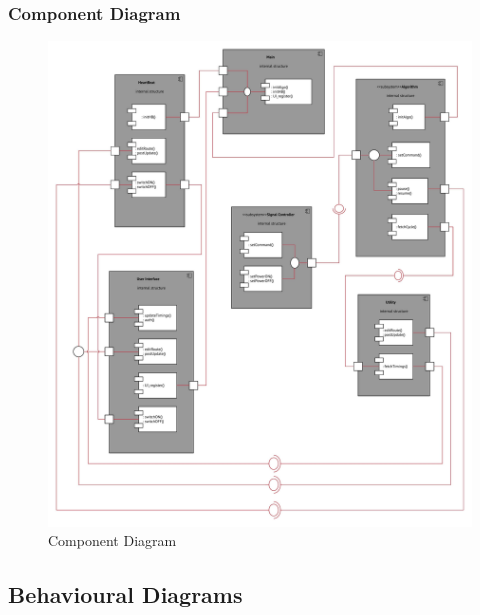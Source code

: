 \documentclass[12pt,a4paper,final]{report}
\begin{document}
\subsubsection{Component Diagram}
	\begin{figure}[!h]
		\begin{center}
			\includegraphics[scale=0.5]{Diagrams/Old Diagrams/Component_Diagram.jpeg}
		\end{center}
		\caption{Component Diagram}
	\end{figure}
\newpage
\subsection{Behavioural Diagrams}
\end{document}
